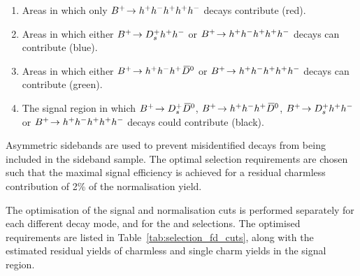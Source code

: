 \begin{enumerate}
\item Areas in which only ${{{B}^+}}\!\rightarrow h^{+}h^{-}h^{+}h^{+}h^{-}$ decays contribute (red).
\item Areas in which either ${{{B}^+}}\!\rightarrow D_{s}^{+}h^{+}h^{-}$  or ${{{B}^+}}\!\rightarrow h^{+}h^{-}h^{+} h^{+}h^{-}$ decays can contribute (blue). 

\item Areas in which either ${{{B}^+}}\!\rightarrow h^{+}h^{-}h^{+}{{\kern 0.2em\overline{\kern -0.2em D}{}}{}^0}$ or ${{{B}^+}}\!\rightarrow h^{+}h^{-}h^{+} h^{+}h^{-}$ decays can contribute (green). 
\item The signal region in which ${{{B}^+}}\!\rightarrow D_{s}^{+} {{\kern 0.2em\overline{\kern -0.2em D}{}}{}^0}$, ${{{B}^+}}\!\rightarrow h^{+}h^{-}h^{+}{{\kern 0.2em\overline{\kern -0.2em D}{}}{}^0}$, ${{{B}^+}}\!\rightarrow D_{s}^{+}h^{+}h^{-}$ or ${{{B}^+}}\!\rightarrow h^{+}h^{-}h^{+}h^{+}h^{-}$ decays could contribute (black).
\end{enumerate}   

Asymmetric \Dzb sidebands are used to prevent misidentified \decay{\Bp}{\Dsp (\decay{\Dzb}{\Km\pip})} decays from being included in the sideband sample.
The optimal selection requirements are chosen such that the maximal signal efficiency is achieved for a residual charmless contribution of 2\% of the normalisation yield.

The optimisation of the signal and normalisation cuts is performed separately for each different \Dsp decay mode, and for the \decay{\Bp}{\Dsp\Kp\Km} and \decay{\Bp}{\Dsp\phiz} selections. The optimised requirements are listed in Table~\ref{tab:selection_fd_cuts}, along with the estimated residual yields of charmless and single charm yields in the signal region.  


